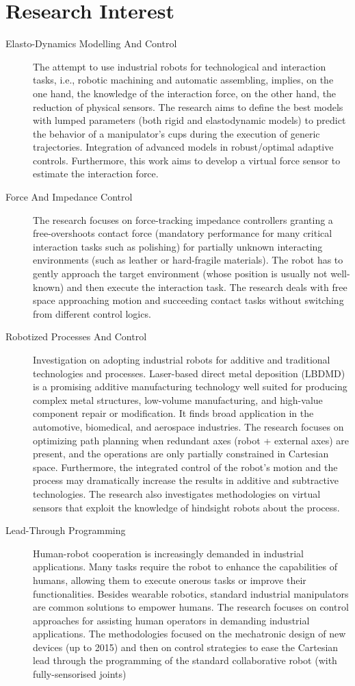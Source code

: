 \documentclass[a4paper,9pt]{extarticle}
\newcounter{industrial_contracts_cnt}
\newcounter{lab_resp_cnt}
\begin{document}
\section*{Research Interest}
\begin{description}
   \item[Elasto-Dynamics Modelling And Control] The attempt to use industrial robots for technological and interaction tasks, i.e., robotic machining and automatic assembling, implies, on the one hand, the knowledge of the interaction force, on the other hand, the reduction of physical sensors. The research aims to define the best models with lumped parameters (both rigid and elastodynamic models) to predict the behavior of a manipulator's cups during the execution of generic trajectories. Integration of advanced models in robust/optimal adaptive controls. Furthermore, this work aims to develop a virtual force sensor to estimate the interaction force.
   \item[Force And Impedance Control] The research focuses on force-tracking impedance controllers granting a free-overshoots contact force (mandatory performance for many critical interaction tasks such as polishing) for partially unknown interacting environments (such as leather or hard-fragile materials). The robot has to gently approach the target environment (whose position is usually not well-known) and then execute the interaction task. The research deals with free space approaching motion and succeeding contact tasks without switching from different control logics. 
   \item[Robotized Processes And Control] Investigation on adopting industrial robots for additive and traditional technologies and processes. Laser-based direct metal deposition (LBDMD) is a promising additive manufacturing technology well suited for producing complex metal structures, low-volume manufacturing, and high-value component repair or modification. It finds broad application in the automotive, biomedical, and aerospace industries. The research focuses on optimizing path planning when redundant axes (robot + external axes) are present, and the operations are only partially constrained in Cartesian space. Furthermore, the integrated control of the robot's motion and the process may dramatically increase the results in additive and subtractive technologies. The research also investigates methodologies on virtual sensors that exploit the knowledge of hindsight robots about the process. 
   \item[Lead-Through Programming] Human-robot cooperation is increasingly demanded in industrial applications. Many tasks require the robot to enhance the capabilities of humans, allowing them to execute onerous tasks or improve their functionalities. Besides wearable robotics, standard industrial manipulators are common solutions to empower humans. The research focuses on control approaches for assisting human operators in demanding industrial applications. The methodologies focused on the mechatronic design of new devices (up to 2015) and then on control strategies to ease the Cartesian lead through the programming of the standard collaborative robot (with fully-sensorised joints)

\end{description}
\end{document}
